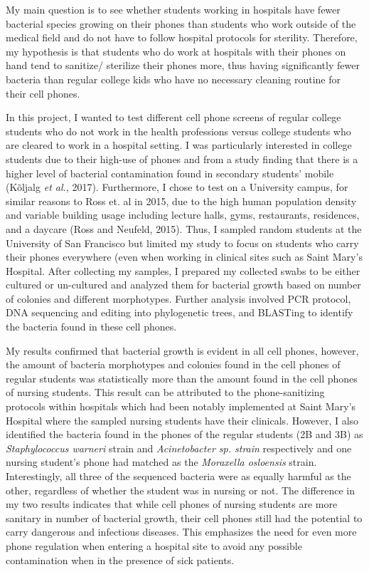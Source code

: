 \documentclass[]{article}
\begin{document}
My main question is to see whether students working in hospitals have
fewer bacterial species growing on their phones than students who work
outside of the medical field and do not have to follow hospital
protocols for sterility. Therefore, my hypothesis is that students who
do work at hospitals with their phones on hand tend to sanitize/
sterilize their phones more, thus having significantly fewer bacteria
than regular college kids who have no necessary cleaning routine for
their cell phones.

In this project, I wanted to test different cell phone screens of
regular college students who do not work in the health professions
versus college students who are cleared to work in a hospital setting. I
was particularly interested in college students due to their high-use of
phones and from a study finding that there is a higher level of
bacterial contamination found in secondary students' mobile (Kõljalg
\emph{et al.}, 2017). Furthermore, I chose to test on a University
campus, for similar reasons to Ross et. al in 2015, due to the high
human population density and variable building usage including lecture
halls, gyms, restaurants, residences, and a daycare (Ross and Neufeld,
2015). Thus, I sampled random students at the University of San
Francisco but limited my study to focus on students who carry their
phones everywhere (even when working in clinical sites such as Saint
Mary's Hospital. After collecting my samples, I prepared my collected
swabs to be either cultured or un-cultured and analyzed them for
bacterial growth based on number of colonies and different morphotypes.
Further analysis involved PCR protocol, DNA sequencing and editing into
phylogenetic trees, and BLASTing to identify the bacteria found in these
cell phones.

My results confirmed that bacterial growth is evident in all cell
phones, however, the amount of bacteria morphotypes and colonies found
in the cell phones of regular students was statistically more than the
amount found in the cell phones of nursing students. This result can be
attributed to the phone-sanitizing protocols within hospitals which had
been notably implemented at Saint Mary's Hospital where the sampled
nursing students have their clinicals. However, I also identified the
bacteria found in the phones of the regular students (2B and 3B) as
\emph{Staphylococcus warneri} strain and \emph{Acinetobacter sp. strain}
respectively and one nursing student's phone had matched as the
\emph{Moraxella osloensis} strain. Interestingly, all three of the
sequenced bacteria were as equally harmful as the other, regardless of
whether the student was in nursing or not. The difference in my two
results indicates that while cell phones of nursing students are more
sanitary in number of bacterial growth, their cell phones still had the
potential to carry dangerous and infectious diseases. This emphasizes
the need for even more phone regulation when entering a hospital site to
avoid any possible contamination when in the presence of sick patients.
\end{document}
